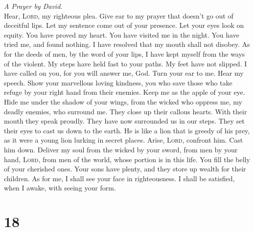 \emph{A Prayer by David.}\\
 Hear, \textsc{Lord}, my righteous plea. Give ear to my
prayer that doesn't go out of deceitful lips.  Let my
sentence come out of your presence. Let your eyes look on equity.
 You have proved my heart. You have visited me in the
night. You have tried me, and found nothing. I have resolved that my
mouth shall not disobey.  As for the deeds of men, by the
word of your lips, I have kept myself from the ways of the violent.
 My steps have held fast to your paths. My feet have not
slipped.  I have called on you, for you will answer me,
God. Turn your ear to me. Hear my speech.  Show your
marvellous loving kindness, you who save those who take refuge by your
right hand from their enemies.  Keep me as the apple of
your eye. Hide me under the shadow of your wings,  from
the wicked who oppress me, my deadly enemies, who surround me.
 They close up their callous hearts. With their mouth
they speak proudly.  They have now surrounded us in our
steps. They set their eyes to cast us down to the earth. 
He is like a lion that is greedy of his prey, as it were a young lion
lurking in secret places.  Arise, \textsc{Lord}, confront
him. Cast him down. Deliver my soul from the wicked by your sword,
 from men by your hand, \textsc{Lord}, from men of the
world, whose portion is in this life. You fill the belly of your
cherished ones. Your sons have plenty, and they store up wealth for
their children.  As for me, I shall see your face in
righteousness. I shall be satisfied, when I awake, with seeing your
form.

\hypertarget{section-17}{%
\section{18}\label{section-17}}

